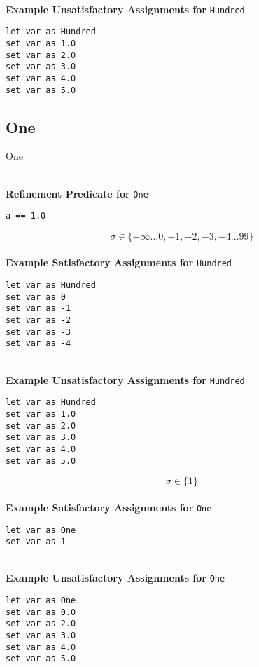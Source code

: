 \textbf{\\ Example Unsatisfactory Assignments for } \texttt{Hundred}
\begin{verbatim}
let var as Hundred
set var as 1.0
set var as 2.0
set var as 3.0
set var as 4.0
set var as 5.0
\end{verbatim}



\subsection{One}
One

\textbf{\\ Refinement Predicate for } \texttt{One}
\begin{verbatim}
a == 1.0
\end{verbatim}

$$\sigma \in \{ -\infty ... 0, -1, -2, -3, -4 ... 99 \}$$ \ \
\textbf{\\ Example Satisfactory Assignments for } \texttt{Hundred}
\begin{verbatim}
let var as Hundred
set var as 0
set var as -1
set var as -2
set var as -3
set var as -4
\end{verbatim}


\textbf{\\ Example Unsatisfactory Assignments for } \texttt{Hundred}
\begin{verbatim}
let var as Hundred
set var as 1.0
set var as 2.0
set var as 3.0
set var as 4.0
set var as 5.0
\end{verbatim}


$$\sigma \in \{ 1 \}$$ \ \
\textbf{\\ Example Satisfactory Assignments for } \texttt{One}
\begin{verbatim}
let var as One
set var as 1
\end{verbatim}


\textbf{\\ Example Unsatisfactory Assignments for } \texttt{One}
\begin{verbatim}
let var as One
set var as 0.0
set var as 2.0
set var as 3.0
set var as 4.0
set var as 5.0
\end{verbatim}



